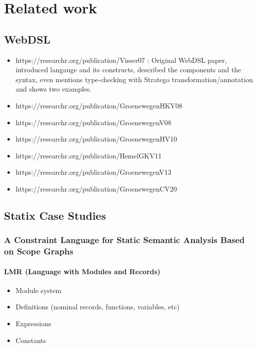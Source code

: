 
\chapter{\label{chap:related-work}Related work}

  \section{WebDSL}

    \begin{itemize}
      \item https://researchr.org/publication/Visser07 : Original WebDSL paper, introduced langauge and its constructs, described the components and the syntax, even mentions type-checking with Stratego transformation/annotation and shows two examples.
      \item https://researchr.org/publication/GroenewegenHKV08
      \item https://researchr.org/publication/GroenewegenV08
      \item https://researchr.org/publication/GroenewegenHV10
      \item https://researchr.org/publication/HemelGKV11
      \item https://researchr.org/publication/GroenewegenV13
      \item https://researchr.org/publication/GroenewegenCV20
    \end{itemize}

  \section{Statix Case Studies}

    \subsection{A Constraint Language for Static Semantic Analysis Based on Scope Graphs}

      \subsubsection{LMR (Language with Modules and Records)}

        \begin{itemize}
          \item Module system
          \item Definitions (nominal records, functions, variables, etc)
          \item Expressions
          \item Constants
        \end{itemize}


